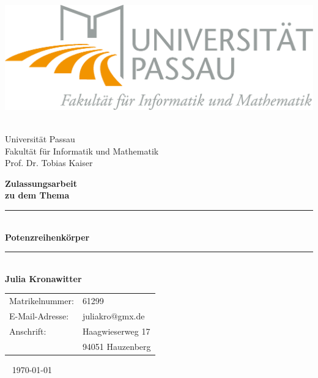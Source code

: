 
\thispagestyle{empty}
%
\begin{center}
\includegraphics[scale=2]{logo.png}
\end{center}
%
\begin{center}
\Large
~\\[0.2cm]
Universität Passau \\
Fakultät für Informatik und Mathematik \\
Prof. Dr. Tobias Kaiser \\
\vspace{50pt}
\end{center}
%
{\huge \centering
\textbf{Zulassungsarbeit}
\vspace{10pt}\\}
{\centering \textbf{zu dem Thema}
\vspace{10pt}\\}

%

{\Large\centering
\rule{\textwidth}{3pt}
~\\[0.01cm]
{\fontsize{30pt}{25pt}\selectfont\bfseries Potenzreihenkörper}
~\\[0.01cm]
\rule{\textwidth}{3pt}
~\\[0.4cm]
\vfill
{\centering
\Large \bfseries Julia Kronawitter \\}
\vfill
\begin{tabular}{ll}
Matrikelnummer: & 61299 \\
E-Mail-Adresse: & juliakro$@$gmx.de \\
Anschrift: & Haagwieserweg 17 \\
          & 94051 Hauzenberg
\end{tabular}
}
\vspace{30pt}
%
%
%
{\centering

~\vfill
\today\\}